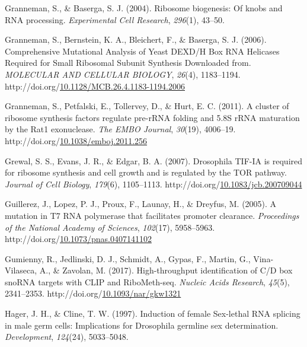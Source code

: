 \documentclass[12pt,oneside]{reedthesis}
\newlength{\cslhangindent}
\newenvironment{CSLReferences}[2] %
 {%
  \setlength{\parindent}{0pt}
  \ifodd #1 \everypar{\setlength{\hangindent}{\cslhangindent}}\ignorespaces\fi
  \ifnum #2 > 0
  \setlength{\parskip}{#2\baselineskip}
  \fi
 }%
 {}
\begin{document}
\begin{CSLReferences}{1}{0}
\leavevmode{}%
Granneman, S., \& Baserga, S. J. (2004). Ribosome biogenesis: Of knobs and {RNA} processing. \emph{Experimental Cell Research}, \emph{296}(1), 43--50.

\leavevmode{}%
Granneman, S., Bernstein, K. A., Bleichert, F., \& Baserga, S. J. (2006). Comprehensive {Mutational Analysis} of {Yeast DEXD}/{H Box RNA Helicases Required} for {Small Ribosomal Subunit Synthesis Downloaded} from. \emph{MOLECULAR AND CELLULAR BIOLOGY}, \emph{26}(4), 1183--1194. http://doi.org/\href{https://doi.org/10.1128/MCB.26.4.1183-1194.2006}{10.1128/MCB.26.4.1183-1194.2006}

\leavevmode{}%
Granneman, S., Petfalski, E., Tollervey, D., \& Hurt, E. C. (2011). A cluster of ribosome synthesis factors regulate pre-{rRNA} folding and 5.{8S rRNA} maturation by the {Rat1} exonuclease. \emph{The EMBO Journal}, \emph{30}(19), 4006--19. http://doi.org/\href{https://doi.org/10.1038/emboj.2011.256}{10.1038/emboj.2011.256}

\leavevmode{}%
Grewal, S. S., Evans, J. R., \& Edgar, B. A. (2007). Drosophila {TIF-IA} is required for ribosome synthesis and cell growth and is regulated by the {TOR} pathway. \emph{Journal of Cell Biology}, \emph{179}(6), 1105--1113. http://doi.org/\href{https://doi.org/10.1083/jcb.200709044}{10.1083/jcb.200709044}

\leavevmode{}%
Guillerez, J., Lopez, P. J., Proux, F., Launay, H., \& Dreyfus, M. (2005). A mutation in {T7 RNA} polymerase that facilitates promoter clearance. \emph{Proceedings of the National Academy of Sciences}, \emph{102}(17), 5958--5963. http://doi.org/\href{https://doi.org/10.1073/pnas.0407141102}{10.1073/pnas.0407141102}

\leavevmode{}%
Gumienny, R., Jedlinski, D. J., Schmidt, A., Gypas, F., Martin, G., Vina-Vilaseca, A., \& Zavolan, M. (2017). High-throughput identification of {C}/{D} box {snoRNA} targets with {CLIP} and {RiboMeth-seq}. \emph{Nucleic Acids Research}, \emph{45}(5), 2341--2353. http://doi.org/\href{https://doi.org/10.1093/nar/gkw1321}{10.1093/nar/gkw1321}

\leavevmode{}%
Hager, J. H., \& Cline, T. W. (1997). Induction of female {Sex-lethal RNA} splicing in male germ cells: Implications for {Drosophila} germline sex determination. \emph{Development}, \emph{124}(24), 5033--5048.


\end{CSLReferences}
\end{document}
